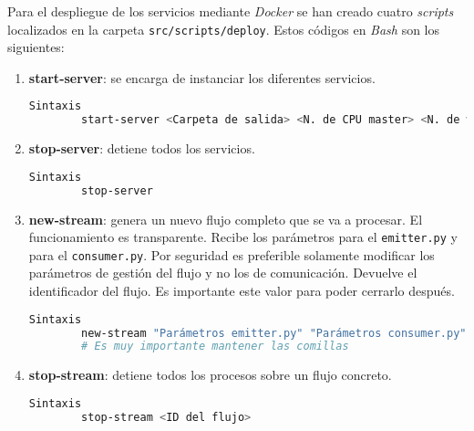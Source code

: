 Para el despliegue de los servicios mediante \textit{Docker} se han creado cuatro \textit{scripts} localizados en la carpeta \texttt{src/scripts/deploy}. Estos códigos en \textit{Bash} son los siguientes:
\begin{enumerate}
    \item \textbf{start-server}: se encarga de instanciar los diferentes servicios.
    \begin{lstlisting}[language=Bash]
 Sintaxis
	    start-server <Carpeta de salida> <N. de CPU master> <N. de workers> <N. de CPU por worker> <Memoria por worker>
    \end{lstlisting}
    \item \textbf{stop-server}: detiene todos los servicios.
    \begin{lstlisting}[language=Bash]
 Sintaxis
	    stop-server
    \end{lstlisting}
    \item \textbf{new-stream}: \label{cap:newstream} genera un nuevo flujo completo que se va a procesar. El funcionamiento es transparente. Recibe los parámetros para el \texttt{emitter.py} y para el \texttt{consumer.py}. Por seguridad es preferible solamente modificar los parámetros de gestión del flujo y no los de comunicación. Devuelve el identificador del flujo. Es importante este valor para poder cerrarlo después.
    \begin{lstlisting}[language=Bash]
 Sintaxis
    	new-stream "Parámetros emitter.py" "Parámetros consumer.py"
    	# Es muy importante mantener las comillas
    \end{lstlisting}
    \item \textbf{stop-stream}: detiene todos los procesos sobre un flujo concreto.
    \begin{lstlisting}[language=Bash]
 Sintaxis
	    stop-stream <ID del flujo>
    \end{lstlisting}
\end{enumerate}



